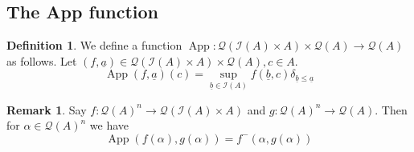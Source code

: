 \documentclass[12pt]{article}
\theoremstyle{plain}
\theoremstyle{definition}
\newtheorem{defn}[thm]{Definition} %
\newtheorem{remark}[thm]{Remark}
\newcommand{\call}[1]{\mathcal{#1}}
\newcommand{\Ical}{\call{I}}
\newcommand{\Qcal}{\call{Q}}
\newcommand{\lto}{\longrightarrow}
\begin{document}
	\subsection{The App function}
	
	\begin{defn}
		We define a function $\operatorname{App}: \Qcal(\Ical(A) \times A) \times \Qcal(A) \lto \Qcal(A)$ as follows. Let $(f, \underline{a}) \in \Qcal(\Ical(A) \times A) \times \Qcal(A), c \in A$.
		\begin{equation}
			\operatorname{App}(f,\underline{a})(c) = \operatorname{sup}_{\underline{b} \in \Ical(A)}f(\underline{b},c)\delta_{\underline{b} \leq \underline{a}}
			\end{equation}
		\end{defn}
	
	\begin{remark}
		Say $f: \Qcal(A)^n \lto \Qcal(\Ical(A) \times A)$ and $g: \Qcal(A)^n \lto \Qcal(A)$. Then for $\alpha \in \Qcal(A)^n$ we have
		\begin{equation}
			\operatorname{App}(f(\alpha), g(\alpha))= f^-(\alpha, g(\alpha))
			\end{equation}
		\end{remark}
	
\end{document}
